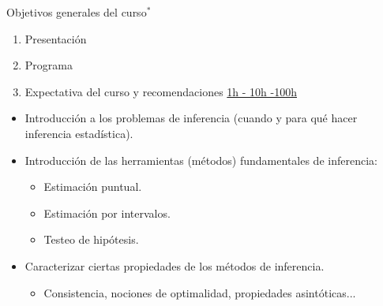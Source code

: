 \documentclass{beamer}
\title{\color{black}{Análisis Estadístico}}
\subtitle{\color{rosee}Introducción\\ \color{rosee}\mydate}
\author[Introducción]{}%
\institute[]{UTDT}
\date[UTDT 2021]{}
\theoremstyle{definition}
\begin{document}
\begin{frame}
  \titlepage
\end{frame}

\begin{frame}{\color{rosee}Objetivos generales del curso${}^*$}
\begin{enumerate}
    \item Presentación
    \item Programa
    \item Expectativa del curso y recomendaciones \href{https://www.youtube.com/watch?v=eorGIZ0Y8RY&ab_channel=Nerdforge}{1h - 10h -100h}
\end{enumerate}

    \begin{itemize}
    \item Introducción a los problemas de inferencia (cuando y para qué hacer inferencia estadística).\medskip
        \item Introducción de las herramientas (métodos) fundamentales de inferencia: \medskip
            \begin{itemize}
        \item Estimación puntual. \medskip 
        \item Estimación por intervalos.\medskip
        \item Testeo de hipótesis.\medskip
            \end{itemize}
        \item Caracterizar ciertas propiedades de los métodos de inferencia.\medskip
                    \begin{itemize}
        \item Consistencia, nociones de optimalidad, propiedades asintóticas...\medskip
            \end{itemize}
    \end{itemize}
\end{frame}
\end{document}

